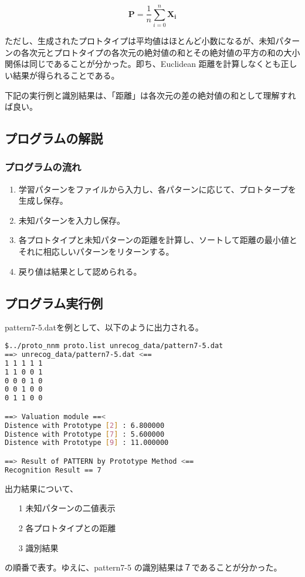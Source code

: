 \documentclass[ %
  uplatex,%
  papersize%
]{jsarticle}
\begin{document}
$$\bm{P}=\frac{1}{n}\sum_{i=0}^{n}\bm{X_{i}}$$

ただし、生成されたプロトタイプは平均値はほとんど小数になるが、未知パターンの各次元とプロトタイプの各次元の絶対値の和とその絶対値の平方の和の大小関係は同じであることが分かった。即ち、Euclidean 距離を計算しなくとも正しい結果が得られることである。

下記の実行例と識別結果は、「距離」は各次元の差の絶対値の和として理解すれば良い。

\subsection{プログラムの解説}
\subsubsection{プログラムの流れ}

\begin{enumerate}
\small
\item 学習パターンをファイルから入力し、各パターンに応じて、プロトタープを生成し保存。
\item 未知パターンを入力し保存。
\item 各プロトタイプと未知パターンの距離を計算し、ソートして距離の最小値とそれに相応しいパターンをリターンする。
\item 戻り値は結果として認められる。
\end{enumerate}

\subsection{プログラム実行例}

pattern7-5.datを例として、以下のように出力される。

\begin{lstlisting}[language=bash]
$../proto_nnm proto.list unrecog_data/pattern7-5.dat
==> unrecog_data/pattern7-5.dat <==
1 1 1 1 1
1 1 0 0 1
0 0 0 1 0
0 0 1 0 0
0 1 1 0 0

==> Valuation module ==<
Distence with Prototype [2] : 6.800000
Distence with Prototype [7] : 5.600000
Distence with Prototype [9] : 11.000000

==> Result of PATTERN by Prototype Method <==
Recognition Result == 7
\end{lstlisting}

出力結果について、

\begin{itemize}
\item[1] 未知パターンの二値表示
\item[2] 各プロトタイプとの距離
\item[3] 識別結果
\end{itemize}
の順番で表す。ゆえに、pattern7-5 の識別結果は７であることが分かった。
\end{document}
